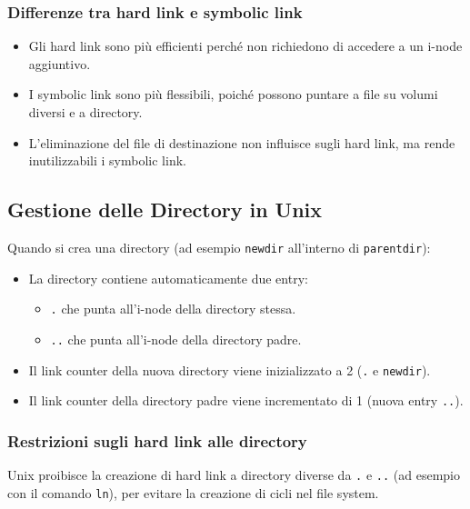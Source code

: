 \subsubsection{Differenze tra hard link e symbolic link}
\begin{itemize}
    \item Gli hard link sono più efficienti perché non richiedono di accedere a un i-node aggiuntivo.
    \item I symbolic link sono più flessibili, poiché possono puntare a file su volumi diversi e a directory.
    \item L'eliminazione del file di destinazione non influisce sugli hard link, ma rende inutilizzabili i symbolic link.
\end{itemize}

\subsection{Gestione delle Directory in Unix}
Quando si crea una directory (ad esempio \texttt{newdir} all'interno di \texttt{parentdir}):
\begin{itemize}
    \item La directory contiene automaticamente due entry:
    \begin{itemize}
        \item \texttt{.} che punta all'i-node della directory stessa.
        \item \texttt{..} che punta all'i-node della directory padre.
    \end{itemize}
    \item Il link counter della nuova directory viene inizializzato a 2 (\texttt{.} e \texttt{newdir}).
    \item Il link counter della directory padre viene incrementato di 1 (nuova entry \texttt{..}).
\end{itemize}

\subsubsection{Restrizioni sugli hard link alle directory}
Unix proibisce la creazione di hard link a directory diverse da \texttt{.} e \texttt{..} (ad esempio con il comando \texttt{ln}), per evitare la creazione di cicli nel file system. 

